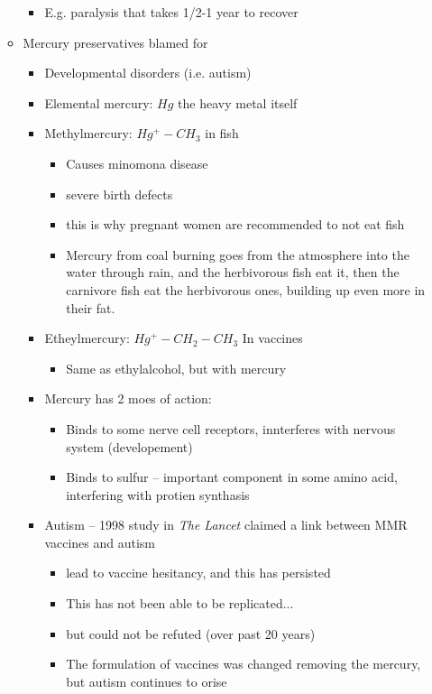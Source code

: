\documentclass{article}
\theoremstyle{definition}
\begin{document}
\begin{itemize}
\begin{itemize}
				\begin{itemize}
					\item E.g. paralysis that takes 1/2-1 year to recover
				\end{itemize}
			\item Mercury preservatives blamed for
				\begin{itemize}
					\item Developmental disorders (i.e. autism)
					\item Elemental mercury: $Hg$ the heavy metal itself
					\item Methylmercury: $Hg^+-CH_3$  in fish
						\begin{itemize}
							\item Causes minomona disease
							\item severe birth defects
							\item this is why pregnant women are recommended to not eat fish
							\item Mercury from coal burning goes from the atmosphere into the water through rain, and the herbivorous fish eat it, then the carnivore fish eat the herbivorous ones, building up even more in their fat.
						\end{itemize}
					\item Etheylmercury: $Hg^+-CH_2-CH_3$ In vaccines
						\begin{itemize}
							\item Same as ethylalcohol, but with mercury
						\end{itemize}
					\item Mercury has 2 moes of action:
						\begin{itemize}
							\item Binds to some nerve cell receptors, innterferes with nervous system (developement)
							\item Binds to sulfur -- important component in some amino acid, interfering with protien synthasis
						\end{itemize}
					\item Autism -- 1998 study in \textit{The Lancet}  claimed a link between MMR vaccines and autism
						\begin{itemize}
							\item lead to vaccine hesitancy, and this has persisted
							\item This has not been able to be replicated...
							\item but could not be refuted (over past 20 years)
							\item The formulation of vaccines was changed removing the mercury, but autism continues to orise

\end{itemize}
\end{itemize}
\end{itemize}
\end{itemize}
\end{document}
